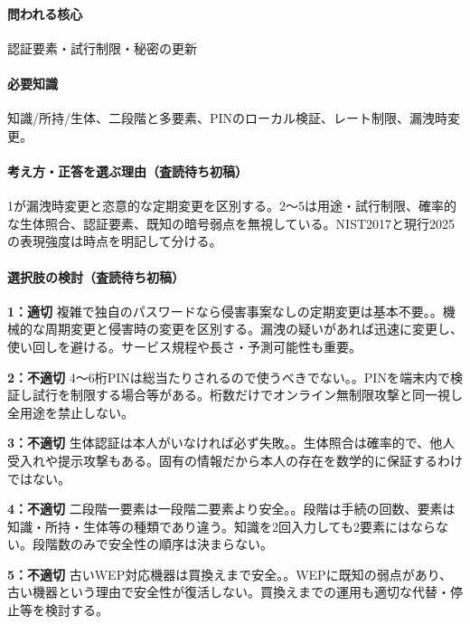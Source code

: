 \paragraph{問われる核心} 認証要素・試行制限・秘密の更新

\paragraph{必要知識} 知識/所持/生体、二段階と多要素、PINのローカル検証、レート制限、漏洩時変更。

\paragraph{考え方・正答を選ぶ理由（査読待ち初稿）} 1が漏洩時変更と恣意的な定期変更を区別する。2〜5は用途・試行制限、確率的な生体照合、認証要素、既知の暗号弱点を無視している。NIST2017と現行2025の表現強度は時点を明記して分ける。

\paragraph{選択肢の検討（査読待ち初稿）}\mbox{}\par

\noindent\textbf{1：適切} 複雑で独自のパスワードなら侵害事案なしの定期変更は基本不要。。機械的な周期変更と侵害時の変更を区別する。漏洩の疑いがあれば迅速に変更し、使い回しを避ける。サービス規程や長さ・予測可能性も重要。\par

\noindent\textbf{2：不適切} 4〜6桁PINは総当たりされるので使うべきでない。。PINを端末内で検証し試行を制限する場合等がある。桁数だけでオンライン無制限攻撃と同一視し全用途を禁止しない。\par

\noindent\textbf{3：不適切} 生体認証は本人がいなければ必ず失敗。。生体照合は確率的で、他人受入れや提示攻撃もある。固有の情報だから本人の存在を数学的に保証するわけではない。\par

\noindent\textbf{4：不適切} 二段階一要素は一段階二要素より安全。。段階は手続の回数、要素は知識・所持・生体等の種類であり違う。知識を2回入力しても2要素にはならない。段階数のみで安全性の順序は決まらない。\par

\noindent\textbf{5：不適切} 古いWEP対応機器は買換えまで安全。。WEPに既知の弱点があり、古い機器という理由で安全性が復活しない。買換えまでの運用も適切な代替・停止等を検討する。\par

